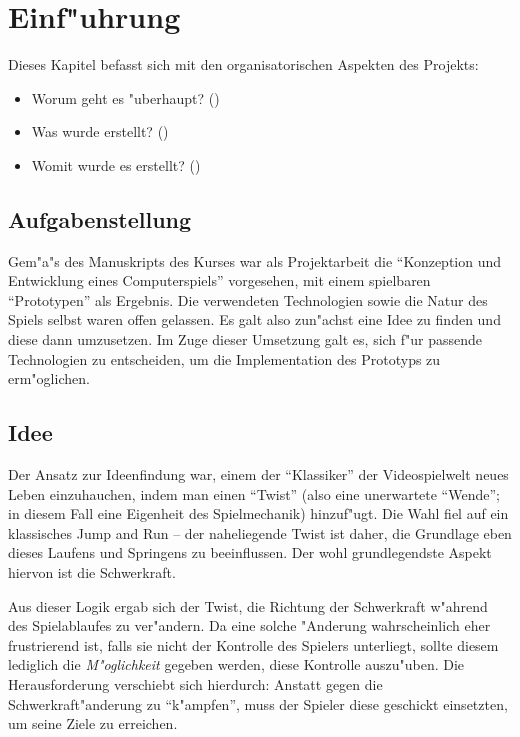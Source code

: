 \section{Einf"uhrung}
\label{sec:intro}
%
Dieses Kapitel befasst sich mit den organisatorischen Aspekten des Projekts:
\begin{itemize}
	\item
		Worum geht es "uberhaupt? ()
	\item
		Was wurde erstellt? ()
	\item
		Womit wurde es erstellt? ()
\end{itemize}
%
\subsection{Aufgabenstellung}
\label{sec:intro/requirements}
%
Gem"a"s des Manuskripts des Kurses war als Projektarbeit die ``Konzeption und Entwicklung
eines Computerspiels'' vorgesehen, mit einem spielbaren ``Prototypen'' als Ergebnis. Die
verwendeten Technologien sowie die Natur des Spiels selbst waren offen gelassen. Es galt
also zun"achst eine Idee zu finden und diese dann umzusetzen. Im Zuge dieser Umsetzung
galt es, sich f"ur passende Technologien zu entscheiden, um die Implementation des
Prototyps zu erm"oglichen.
%
\subsection{Idee}
\label{sec:intro/idea}
Der Ansatz zur Ideenfindung war, einem der ``Klassiker'' der Videospielwelt neues
Leben einzuhauchen, indem man einen ``Twist'' (also eine unerwartete ``Wende'';
in diesem Fall eine Eigenheit des Spielmechanik) hinzuf"ugt. Die Wahl fiel auf
ein klassisches Jump and Run -- der naheliegende Twist ist daher, die Grundlage eben
dieses Laufens und Springens zu beeinflussen. Der wohl grundlegendste Aspekt hiervon
ist die Schwerkraft.

Aus dieser Logik ergab sich der Twist, die Richtung der Schwerkraft w"ahrend des
Spielablaufes zu ver"andern. Da eine solche "Anderung wahrscheinlich eher frustrierend
ist, falls sie nicht der Kontrolle des Spielers unterliegt, sollte diesem lediglich
die \textit{M"oglichkeit} gegeben werden, diese Kontrolle auszu"uben. Die Herausforderung
verschiebt sich hierdurch: Anstatt gegen die Schwerkraft"anderung zu ``k"ampfen'',
muss der Spieler diese geschickt einsetzten, um seine Ziele zu erreichen.


